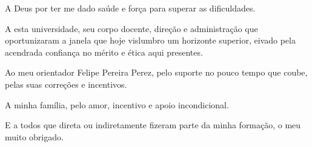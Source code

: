 \begin{agradecimentos}
A Deus por ter me dado saúde e força para superar as dificuldades.

A esta universidade, seu corpo docente, direção e administração que oportunizaram a janela que hoje vislumbro um horizonte superior, eivado pela acendrada confiança no mérito e ética aqui presentes.

Ao meu orientador Felipe Pereira Perez, pelo suporte no pouco tempo que coube, pelas suas correções e incentivos.

A minha família, pelo amor, incentivo e apoio incondicional.

E a todos que direta ou indiretamente fizeram parte da minha formação, o meu muito obrigado.

\end{agradecimentos}